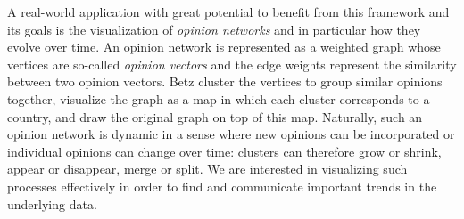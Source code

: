 A real-world application with great potential to benefit from this framework and its goals is the visualization of \emph{opinion networks} \cite{betz2019applying} and in particular how they evolve over time. An opinion network is represented as a weighted graph whose vertices are so-called \emph{opinion vectors} and the edge weights represent the similarity between two opinion vectors. Betz \etal{} \cite{betz2019applying} cluster the vertices to group similar opinions together, visualize the graph as a map in which each cluster corresponds to a country, and draw the original graph on top of this map. Naturally, such an opinion network is dynamic in a sense where new opinions can be incorporated or individual opinions can change over time: clusters can therefore grow or shrink, appear or disappear, merge or split. We are interested in visualizing such processes effectively in order to find and communicate important trends in the underlying data.
